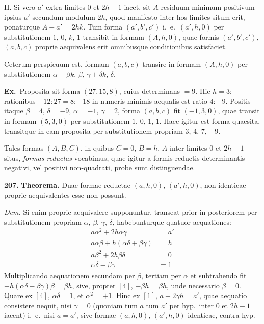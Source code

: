 \documentclass[12pt,a4paper]{article}
\theoremstyle{plain}
\theoremstyle{definition}
\theoremstyle{remark}
\begin{document}
II. Si vero $a'$ extra limites $0$ et $2h-1$ iacet, sit $A$ residuum minimum positivum ipsius $a'$ secundum modulum $2h$, quod manifesto inter hos limites situm erit, ponaturque $A-a'=2hk$. Tum forma $(a',b',c')$ i.\ e.\ $(a',h,0)$ per substitutionem $1$, $0$, $k$, $1$ transibit in formam $(A,h,0)$, quae formis $(a',b',c')$, $(a,b,c)$ proprie aequivalens erit omnibusque conditionibus satisfaciet.

Ceterum perspicuum est, formam $(a,b,c)$ transire in formam $(A,h,0)$ per substitutionem $\alpha+\beta k$, $\beta$, $\gamma+\delta k$, $\delta$.

\textbf{Ex.}\ Proposita sit forma $(27,15,8)$, cuius determinans $=9$. Hic $h=3$; rationibus $-12:27=8:-18$ in numeris minimis aequalis est ratio $4:-9$. Positis itaque $\beta=4$, $\delta=-9$, $\alpha=-1$, $\gamma=2$, forma $(a,b,c)$ fit $(-1,3,0)$, quae transit in formam $(5,3,0)$ per substitutionem $1$, $0$, $1$, $1$. Haec igitur est forma quaesita, transitque in eam proposita per substitutionem propriam $3$, $4$, $7$, $-9$.

Tales formas $(A,B,C)$, in quibus $C=0$, $B=h$, $A$ inter limites $0$ et $2h-1$ situs, \emph{formas reductas} vocabimus, quae igitur a formis reductis determinantis negativi, vel positivi non-quadrati, probe sunt distinguendae.

\textbf{207.}
\textbf{Theorema.}
Duae formae reductae $(a,h,0)$, $(a',h,0)$, non identicae proprie aequivalentes esse non possunt.

\textit{Dem.}
Si enim proprie aequivalere supponuntur, transeat prior in posteriorem per substitutionem propriam $\alpha$, $\beta$, $\gamma$, $\delta$, habebunturque quatuor aequationes:
\begin{align*}
a\alpha^2+2h\alpha\gamma &= a' \tag{1} \\
a\alpha\beta+h(\alpha\delta+\beta\gamma) &= h \tag{2} \\
a\beta^2+2h\beta\delta &= 0 \tag{3} \\
\alpha\delta-\beta\gamma &= 1 \tag{4}
\end{align*}
Multiplicando aequationem secundam per $\beta$, tertiam per $\alpha$ et subtrahendo fit $-h(\alpha\delta-\beta\gamma)\beta=\beta h$, sive, propter $[4]$, $-\beta h=\beta h$, unde necessario $\beta=0$. Quare ex $[4]$, $\alpha\delta=1$, et $\alpha^2=+1$. Hinc ex $[1]$, $a+2\gamma h=a'$, quae aequatio consistere nequit, nisi $\gamma=0$ (quoniam tum $a$ tum $a'$ per hyp.\ inter $0$ et $2h-1$ iacent) i.\ e.\ nisi $a=a'$, sive formae $(a,h,0)$, $(a',h,0)$ identicae, contra hyp.
\end{document}
